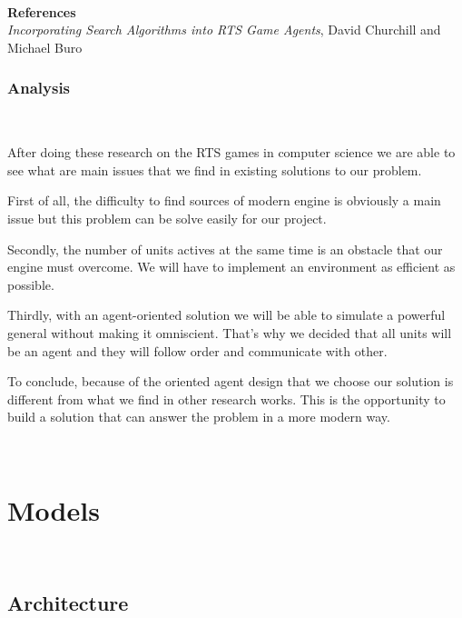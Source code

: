 \documentclass[a4paper,10pt]{book}
\begin{document}
~

\textbf{References} 
\textit{\\Incorporating Search Algorithms into RTS Game Agents},
David Churchill and Michael Buro

\subsection{Analysis}

~

After doing these research on the RTS games in computer science we are able to see what are main issues that we find in existing solutions to our problem.

First of all, the difficulty to find sources of modern engine is obviously a main issue but this problem can be solve easily for our project.

Secondly, the number of units actives at the same time is an obstacle that our engine must overcome. We will have to implement an environment as efficient as possible.

Thirdly, with an agent-oriented solution we will be able to simulate a powerful general without making it omniscient. That's why we decided that all units will be an agent and they will follow order and communicate with other.

To conclude, because of the oriented agent design that we choose our solution is different from what we find in other research works. This is the opportunity to build a solution that can answer the problem in a more modern way.

~

\chapter {Models}

~

\section {Architecture}

~
\end{document}
